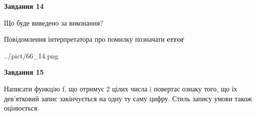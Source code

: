 \documentclass[11pt, ukrainian]{article}
\begin{document}
{\begin {large}
{\begin {center}\textbf{Завдання 14}\end {center}}\par
Що буде виведено за виконання? \par
Повідомлення інтерпретатора про помилку позначати \textbf{error}

\begin{center}
	{../pict/66_14.png}
\end{center}
\newpage

{\begin {center}\textbf{Завдання 15}\end {center}}\par

Написати функцiю f, що отримує 2 цілих числа i повертає ознаку того, що їх дев'ятковий запис закінчується на одну ту саму цифру. Стиль запису умови також оцінюється.\par
\newpage

\end {large}}
\end{document}
